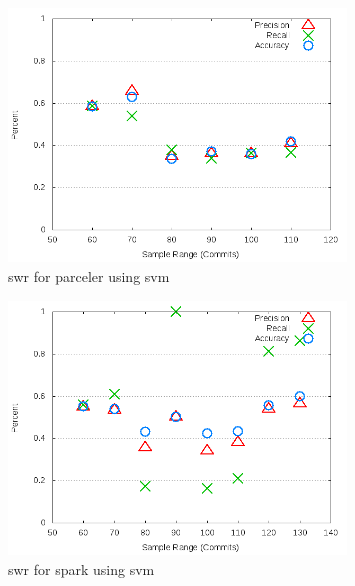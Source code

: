 \begin{figure}[!t]
\centering
\includegraphics[width=0.8\textwidth]{images/svm/test_1/parceler_sample_range.png}
\caption{\gls{swr} for parceler using \gls{svm}}
\label{fig:test_1_parceler_svm}
\end{figure}

\clearpage
\begin{figure}[!t]
\centering
\includegraphics[width=0.8\textwidth]{images/svm/test_1/spark_sample_range.png}
\caption{\gls{swr} for spark using \gls{svm}}
\label{fig:test_1_spark_svm}
\end{figure}


